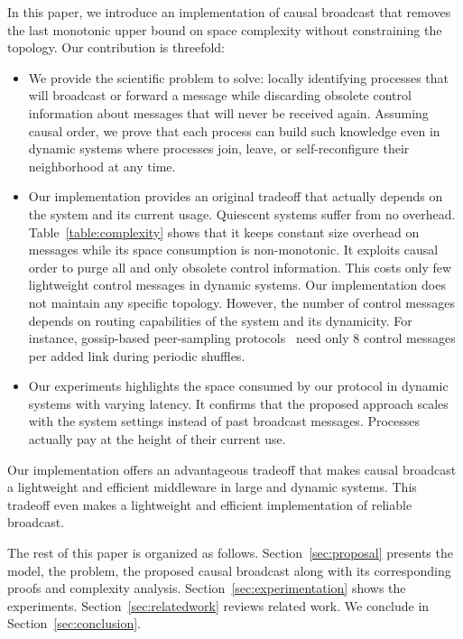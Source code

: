 In this paper, we introduce an implementation of causal broadcast that removes
the last monotonic upper bound on space complexity without constraining the
topology.  Our contribution is threefold:
\begin{itemize}[leftmargin=*]
\item We provide the scientific problem to solve: locally identifying processes
  that will broadcast or forward a message while discarding obsolete control
  information about messages that will never be received again. Assuming causal
  order, we prove that each process can build such knowledge even in dynamic
  systems where processes join, leave, or self-reconfigure their neighborhood at
  any time.
\item Our implementation provides an original tradeoff that actually depends on
  the system and its current usage. Quiescent systems suffer from no
  overhead. Table~\ref{table:complexity} shows that it keeps constant size
  overhead on messages while its space consumption is non-monotonic. It exploits
  causal order to purge all and only obsolete control information. This costs
  only few lightweight control messages in dynamic systems.  Our implementation
  does not maintain any specific topology. However, the number of control
  messages depends on routing capabilities of the system and its dynamicity. For
  instance, gossip-based peer-sampling
  protocols~\cite{jelasity2007gossip,jelasity2009tman,nedelec2017adaptive} need
  only 8 control messages per added link during periodic shuffles.
\item Our experiments highlights the space consumed by our protocol in dynamic
  systems with varying latency. It confirms that the proposed approach scales
  with the system settings instead of past broadcast messages. Processes
  actually pay at the height of their current use.
\end{itemize}
Our implementation offers an advantageous tradeoff that makes causal broadcast a
lightweight and efficient middleware in large and dynamic systems. This tradeoff
even makes a lightweight and efficient implementation of reliable broadcast.

The rest of this paper is organized as follows. 
Section~\ref{sec:proposal} presents the model, the problem, the proposed causal
broadcast along with its corresponding proofs and complexity
analysis. Section~\ref{sec:experimentation} shows the
experiments. Section~\ref{sec:relatedwork} reviews related work. We conclude in
Section~\ref{sec:conclusion}.


